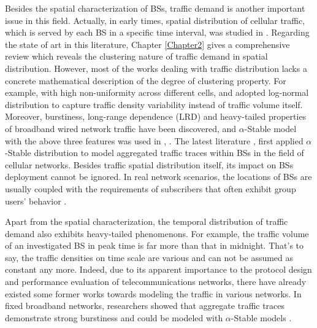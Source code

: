 Besides the spatial characterization of BSs, traffic demand is another important issue in this field. Actually, in early times, spatial distribution of cellular traffic, which is served by each BS in a specific time interval, was studied in \cite{gotzner1998spatial}. Regarding the state of art in this literature, Chapter \ref{Chapter2} gives a comprehensive review which reveals the clustering nature of traffic demand in spatial distribution. However, most of the works dealing with traffic distribution lacks a concrete mathematical description of the degree of clustering property. For example, with high non-uniformity across different cells, \cite{lee2014spatial} and \cite{klessig2014framework} adopted log-normal distribution to capture traffic density variability instead of traffic volume itself. Moreover, burstiness, long-range dependence (LRD) and heavy-tailed properties of broadband wired network traffic have been discovered, and ${\alpha}$-Stable model with the above three features was used in \cite{crovella1997self}, \cite{xiaohu2004testing}. The latest literature  \cite{li2015understanding}, first applied ${\alpha}$-Stable distribution to model aggregated traffic traces within BSs in the field of cellular networks. Besides traffic spatial distribution itself, its impact on BSs deployment cannot be ignored. In real network scenarios, the locations of BSs are usually coupled with the requirements of subscribers that often exhibit group users' behavior \cite{zhang2013base}.

Apart from the spatial characterization, the temporal distribution of traffic demand also exhibits heavy-tailed phenomenons. For example, the traffic volume of an investigated BS in peak time is far more than that in midnight. That's to say, the traffic densities on time scale are various and can not be assumed as constant any more. Indeed, due to its apparent importance to the protocol design and performance evaluation of telecommunications networks, there have already existed some former works towards modeling the traffic in various networks. In fixed broadband networks, researchers showed that aggregate traffic traces demonstrate strong burstiness and could be modeled with $\alpha$-Stable models \cite{gallardo2000use,xiaohu2004testing}.

